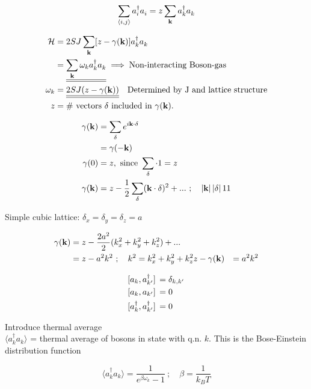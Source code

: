 \begin{equation}
    \sum_{\langle i, j \rangle} a_i^\dagger a_i^{} = z\sum_{\vb{k}}a_k^\dagger a_k^{}
\end{equation}

\begin{align}
    \Ha &= 2SJ\sum_{\vb{k}}[z-\gamma(\vb{k})]a_k^\dagger a_k^{} \\
    &= \uline{\uline{\sum_{\vb{k}}\omega_k a_k^\dagger a_k^{}}} \implies \text{Non-interacting Boson-gas}\\
    \omega_k &= \uline{\uline{2SJ(z-\gamma(\vb{k}))}} \quad \text{Determined by J and lattice structure} \\
    z &= \# \text{ vectors } \vb{\delta} \text{ included in } \gamma(\vb{k}).
\end{align}

\begin{align}
    \gamma(\vb{k}) &= \sum_{\vb{\delta}}e^{i\vb{k}\cdot\vb{\delta}} \\
    &= \gamma(-\vb{k}) \\
    \gamma(0) &= z, \text{ since } \sum_{\vb{\delta}}\cdot 1 = z \\
    \gamma(\vb{k}) &= z - \frac{1}{2}\sum_{\vb{\delta}}(\vb{k}\cdot\vb{\delta})^2 + ... \ ; \quad \abs*{\vb{k}}\abs*{\vb{\delta}} 1 1
\end{align}

Simple cubic lattice: \quad $\delta_x = \delta_y = \delta_z = a$

\begin{align}
    \gamma(\vb{k}) &= z - \frac{2a^2}{2}(k_x^2 + k_y^2 + k_z^2) + ... \\
    &= z - a^2 k^2 \ ; \quad k^2 = k_x^2 + k_y^2 + k_z^2
    z - \gamma(\vb{k}) &= a^2 k^2
\end{align}

\begin{align}
    \comm*{a_k}{a_{k'}^\dagger} &= \delta_{k, k'} \\
    \comm*{a_k}{a_{k'}} &= 0 \\
    \comm*{a_k^\dagger}{a_{k'}^\dagger} &= 0
\end{align}

Introduce thermal average \\ 
 $\langle a_k^\dagger a_k \rangle$ = thermal average of bosons in state with q.n. $k$. This is the Bose-Einstein distribution function

\begin{equation}
    \langle a_k^\dagger a_k \rangle = \frac{1}{e^{\beta \omega_k} - 1} \ ; \quad \beta = \frac{1}{k_B T}
\end{equation}

